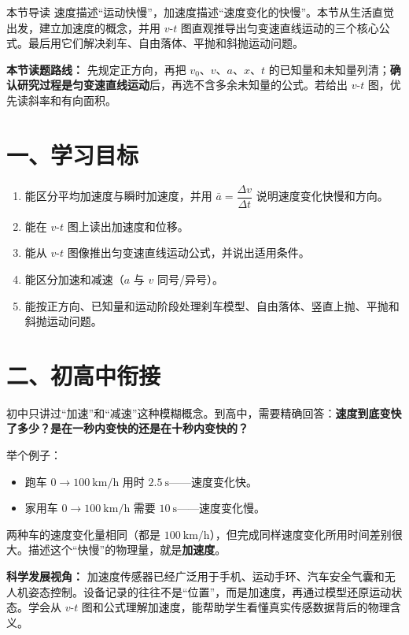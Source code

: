 
\begin{learningbox}{本节导读}
速度描述“运动快慢”，加速度描述“速度变化的快慢”。本节从生活直觉出发，建立加速度的概念，并用 $v$-$t$ 图直观推导出匀变速直线运动的三个核心公式。最后用它们解决刹车、自由落体、平抛和斜抛运动问题。
\end{learningbox}

\textbf{本节读题路线：} 先规定正方向，再把 $v_0$、$v$、$a$、$x$、$t$ 的已知量和未知量列清；\textbf{确认研究过程是匀变速直线运动}后，再选不含多余未知量的公式。若给出 $v$-$t$ 图，优先读斜率和有向面积。

\section*{一、学习目标}

\begin{enumerate}
  \item 能区分平均加速度与瞬时加速度，并用 $\bar a = \dfrac{\Delta v}{\Delta t}$ 说明速度变化快慢和方向。
  \item 能在 $v$-$t$ 图上读出加速度和位移。
  \item 能从 $v$-$t$ 图像推出匀变速直线运动公式，并说出适用条件。
  \item 能区分加速和减速（$a$ 与 $v$ 同号/异号）。
  \item 能按正方向、已知量和运动阶段处理刹车模型、自由落体、竖直上抛、平抛和斜抛运动问题。
\end{enumerate}

\section*{二、初高中衔接}

初中只讲过“加速”和“减速”这种模糊概念。到高中，需要精确回答：\textbf{速度到底变快了多少？是在一秒内变快的还是在十秒内变快的？}

举个例子：
\begin{itemize}
  \item 跑车 $0\to 100\ \mathrm{km/h}$ 用时 $2.5\ \mathrm{s}$——速度变化快。
  \item 家用车 $0\to 100\ \mathrm{km/h}$ 需要 $10\ \mathrm{s}$——速度变化慢。
\end{itemize}

两种车的速度变化量相同（都是 $100\ \mathrm{km/h}$），但完成同样速度变化所用时间差别很大。描述这个“快慢”的物理量，就是\textbf{加速度}。

\textbf{科学发展视角：} 加速度传感器已经广泛用于手机、运动手环、汽车安全气囊和无人机姿态控制。设备记录的往往不是“位置”，而是加速度，再通过模型还原运动状态。学会从 $v$-$t$ 图和公式理解加速度，能帮助学生看懂真实传感数据背后的物理含义。

